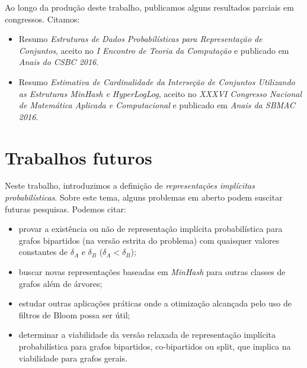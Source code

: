 Ao longo da produção deste trabalho, publicamos alguns resultados parciais em congressos. Citamos:
\begin{itemize}
  \item Resumo \emph{Estruturas de Dados Probabilísticas para Representação de Conjuntos}, aceito no \emph{I Encontro de Teoria da Computação} e publicado em \emph{Anais do CSBC 2016}.
  
  \item Resumo \emph{Estimativa de Cardinalidade da Interseção de Conjuntos Utilizando as Estruturas MinHash e HyperLogLog}, aceito no \emph{XXXVI Congresso Nacional de Matemática Aplicada e Computacional} e publicado em \emph{Anais da SBMAC 2016}.
\end{itemize}

\section{Trabalhos futuros}

Neste trabalho, introduzimos a definição de \emph{representações implícitas probabilísticas}. Sobre este tema, alguns problemas em aberto podem suscitar futuras pesquisas. Podemos citar:

\begin{itemize}
  \item provar a existência ou não de representação implícita probabilística para grafos bipartidos (na versão estrita do problema) com quaisquer valores constantes de $\delta_A$ e $\delta_B$ ($\delta_A < \delta_B$);
  
  \item buscar novas representações baseadas em \emph{MinHash} para outras classes de grafos além de árvores;

  \item estudar outras aplicações práticas onde a otimização alcançada pelo uso de filtros de Bloom possa ser útil;
  
  \item determinar a viabilidade da versão relaxada de representação implícita probabilística para grafos bipartidos, co-bipartidos ou split, que implica na viabilidade para grafos gerais.
\end{itemize}
